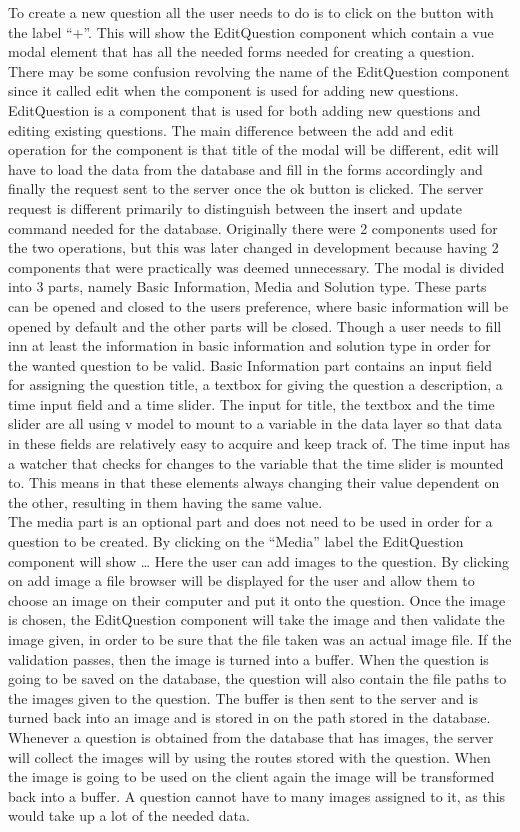 To create a new question all the user needs to do is to click on the button with the label “+”. This will show the EditQuestion component which contain a vue modal element that has all the needed forms needed for creating a question. There may be some confusion revolving the name of the EditQuestion component since it called edit when the component is used for adding new questions. EditQuestion is a component that is used for both adding new questions and editing existing questions. The main difference between the add and edit operation for the component is that title of the modal will be different, edit will have to load the data from the database and fill in the forms accordingly and finally the request sent to the server once the ok button is clicked. The server request is different primarily to distinguish between the insert and update command needed for the database. Originally there were 2 components used for the two operations, but this was later changed in development because having 2 components that were practically was deemed unnecessary. The modal is divided into 3 parts, namely Basic Information, Media and Solution type.  These parts can be opened and closed to the users preference, where basic information will be opened by default and the other parts will be closed. Though a user needs to fill inn at least the information in basic information and solution type in order for the wanted question to be valid. Basic Information part contains an input field for assigning the question title, a textbox for giving the question a description, a time input field and a time slider. The input for title, the textbox and the time slider are all using v model to mount to a variable in the data layer so that data in these fields are relatively easy to acquire and keep track of. The time input has a watcher that checks for changes to the variable that the time slider is mounted to. This means in that these elements always changing their value dependent on the other, resulting in them having the same value.\\[11pt]
The media part is an optional part and does not need to be used in order for a question to be created. By clicking on the “Media” label the EditQuestion component will show … 
Here the user can add images to the question.  By clicking on add image a file browser will be displayed for the user and allow them to choose an image on their computer and put it onto the question. Once the image is chosen, the EditQuestion component will take the image and then validate the image given, in order to be sure that the file taken was an actual image file. If the validation passes, then the image is turned into a buffer. When the question is going to be saved on the database, the question will also contain the file paths to the images given to the question. The buffer is then sent to the server and is turned back into an image and is stored in on the path stored in the database. Whenever a question is obtained from the database that has images, the server will collect the images will by using the routes stored with the question. When the image is going to be used on the client again the image will be transformed back into a buffer. A question cannot have to many images assigned to it, as this would take up a lot of the needed data.\\[11pt]
